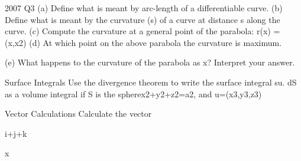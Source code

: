 2007 Q3
(a) Define what is meant by arc-length of a differentiable curve. 
(b) Define what is meant by the curvature (s) of a curve at distance s along the curve. 
(c) Compute the curvature at a general point of the parabola: r(x) = (x,x2)
(d) At which point on the above parabola the curvature is maximum.

(e) What happens to the curvature of the parabola as x? Interpret your answer.

Surface Integrals
Use the divergence theorem to write the surface integral
su. dS
as a volume integral if S is the spherex2+y2+z2=a2, and u=(x3,y3,z3)

Vector Calculations
Calculate the vector



i+j+k


x

